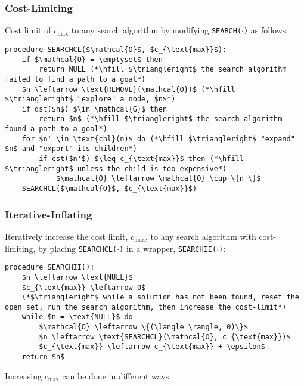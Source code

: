 \subsubsection{Cost-Limiting}
\begin{definition}
    Cost limit of $c_{\text{max}}$ to any search algorithm by modifying \texttt{SEARCH($\cdot$)} as follows:

\begin{lstlisting}
procedure SEARCHCL($\mathcal{O}$, $c_{\text{max}}$):
    if $\mathcal{O} = \emptyset$ then
        return NULL (*\hfill $\triangleright$ the search algorithm failed to find a path to a goal*)
    $n \leftarrow \text{REMOVE}(\mathcal{O})$ (*\hfill $\triangleright$ "explore" a node, $n$*)
    if dst($n$) $\in \mathcal{G}$ then
        return $n$ (*\hfill $\triangleright$ the search algorithm found a path to a goal*)
    for $n' \in \text{chl}(n)$ do (*\hfill $\triangleright$ "expand" $n$ and "export" its children*)
        if cst($n'$) $\leq c_{\text{max}}$ then (*\hfill $\triangleright$ unless the child is too expensive*)
            $\mathcal{O} \leftarrow \mathcal{O} \cup \{n'\}$
    SEARCHCL($\mathcal{O}$, $c_{\text{max}}$)
\end{lstlisting}

\end{definition}

\subsubsection{Iterative-Inflating}
\begin{definition}
    Iteratively increase the cost limit, $c_{\text{max}}$, to any search algorithm with cost-limiting, by placing \texttt{SEARCHCL($\cdot$)} in a wrapper, \texttt{SEARCHII($\cdot$)}:

\begin{lstlisting}
procedure SEARCHII():
    $n \leftarrow \text{NULL}$
    $c_{\text{max}} \leftarrow 0$
    (*$\triangleright$ while a solution has not been found, reset the open set, run the search algorithm, then increase the cost-limit*)
    while $n = \text{NULL}$ do
        $\mathcal{O} \leftarrow \{(\langle \rangle, 0)\}$
        $n \leftarrow \text{SEARCHCL}(\mathcal{O}, c_{\text{max}})$
        $c_{\text{max}} \leftarrow c_{\text{max}} + \epsilon$
    return $n$
\end{lstlisting}

\end{definition}

\begin{warning}
    Increasing $c_{\text{max}}$ can be done in different ways.
\end{warning}

